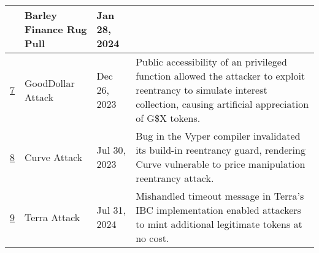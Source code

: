 \begin{table*}[htbp]
\begin{footnotesize}
\begin{tabular}{|p{0.3cm}|p{3.9cm}|p{1.6cm}|p{10.5cm}|}
        \cline{2-3}
         & Barley Finance Rug Pull & Jan 28, 2024 & \\
        \hline
        \hyperref[case-study:7]{7} & GoodDollar Attack & Dec 26, 2023 & Public accessibility of an privileged function allowed the attacker to exploit reentrancy to simulate interest collection, causing artificial appreciation of G\$X tokens. \\
        \hline
        \hyperref[case-study:8]{8} & Curve Attack & Jul 30, 2023 & Bug in the Vyper compiler invalidated its build-in reentrancy guard, rendering Curve vulnerable to price manipulation reentrancy attack. \\
        \hline
        \hyperref[case-study:9]{9} & Terra Attack & Jul 31, 2024 & Mishandled timeout message in Terra's IBC implementation enabled attackers to mint additional legitimate tokens at no cost. \\
        \hline
    \end{tabular}
\end{footnotesize}
    \vspace{-4mm}
    \label{tab:1}
\end{table*}
\egroup